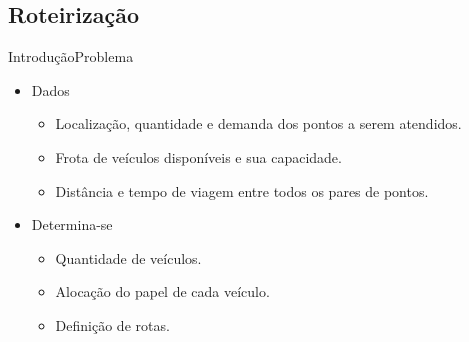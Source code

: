 \documentclass{beamer}
\newenvironment{outeritemize}{\begin{itemize}}{\end{itemize}\vspace{12pt}}
\begin{document}
\subsection{Roteirização}
\begin{frame}{Introdução}{Problema}

\begin{outeritemize}
    \item Dados
    \begin{itemize}
        \item Localização, quantidade e demanda dos pontos a serem atendidos.
        \item Frota de veículos disponíveis e sua capacidade.
        \item Distância e tempo de viagem entre todos os pares de pontos.
    \end{itemize}
\vspace{0.5cm}
    \item Determina-se
    \begin{itemize}
        \item Quantidade de veículos.
        \item Alocação do papel de cada veículo.
        \item Definição de rotas.
    \end{itemize}
\end{outeritemize}
\end{frame}
\end{document}

